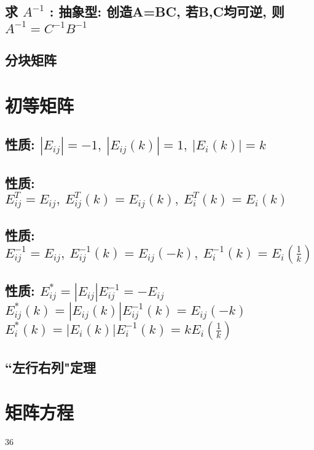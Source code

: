 \documentclass[UTF8]{ctexart}
\begin{document}
		\subsection{求 $A^{-1}$ : 抽象型: 创造A=BC, 若B,C均可逆, 则 $A^{-1}=C^{-1}B^{-1}$ }
		
		\subsection{分块矩阵}
	
	
	
	
	
	\section{初等矩阵}
	
		\subsection{性质: $ \left| E_{ij} \right|=-1,\ \left| E_{ij}\left( k \right) \right|=1,\ \left| E_i\left( k \right) \right|=k	$}
		
	
		\subsection{性质: $E_{ij}^{T}=E_{ij},\ E_{ij}^{T}\left( k \right) =E_{ij}\left( k \right) ,\ E_{i}^{T}\left( k \right) =E_i\left( k \right) $}		
	
		\subsection{性质: $E_{ij}^{-1}=E_{ij},\ E_{ij}^{-1}\left( k \right) =E_{ij}\left( -k \right) ,\ E_{i}^{-1}\left( k \right) =E_i\left( \frac{1}{k} \right) $}
		
		\subsection{性质: $E_{ij}^{*}=\left| E_{ij} \right|E_{ij}^{-1}=-E_{ij}$ \\
			$E_{ij}^{*}\left( k \right) =\left| E_{ij}\left( k \right) \right|E_{ij}^{-1}\left( k \right) =E_{ij}\left( -k \right) 			$\\
			$E_{i}^{*}\left( k \right) =\left| E_i\left( k \right) \right|E_{i}^{-1}\left( k \right) =kE_i\left( \frac{1}{k} \right) 	$
		}
	
	
	\subsection{``左行右列"定理}
	
	
	
	\section{矩阵方程}
		
		
	
	36
	
	
	
	
	
	
	
	
	
	
	
	
\end{document}
